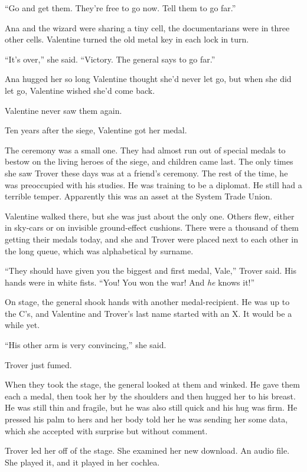 “Go and get them. They’re free to go now. Tell them to go far.”

Ana and the wizard were sharing a tiny cell, the documentarians
were in three other cells. Valentine turned the old metal key in
each lock in turn.

“It’s over,” she said. “Victory. The general says to go far.”

Ana hugged her so long Valentine thought she’d never let go, but
when she did let go, Valentine wished she’d come back.

Valentine never saw them again.

\tb

Ten years after the siege, Valentine got her medal.

The ceremony was a small one. They had almost run out of special
medals to bestow on the living heroes of the siege, and children
came last. The only times she saw Trover these days was at a
friend’s ceremony. The rest of the time, he was preoccupied with
his studies. He was training to be a diplomat. He still had a
terrible temper. Apparently this was an asset at the System Trade
Union.

Valentine walked there, but she was just about the only one. Others
flew, either in sky-cars or on invisible ground-effect cushions.
There were a thousand of them getting their medals today, and she
and Trover were placed next to each other in the long queue, which
was alphabetical by surname.

“They should have given you the biggest and first medal, Vale,”
Trover said. His hands were in white fists. “You! You won the war!
And \emph{he} knows it!”

On stage, the general shook hands with another medal-reci\-pient. He
was up to the C’s, and Valentine and Trover’s last name started
with an X. It would be a while yet.

“His other arm is very convincing,” she said.

Trover just fumed.

When they took the stage, the general looked at them and winked. He
gave them each a medal, then took her by the shoulders and then
hugged her to his breast. He was still thin and fragile, but he was
also still quick and his hug was firm. He pressed his palm to hers
and her body told her he was sending her some data, which she
accepted with surprise but without comment.

Trover led her off of the stage. She examined her new download. An
audio file. She played it, and it played in her cochlea.

